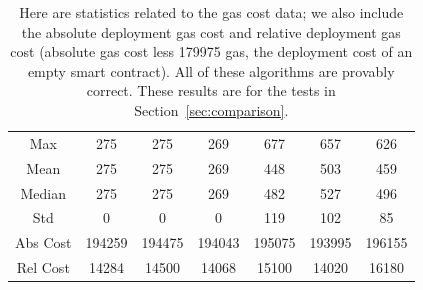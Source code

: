 \begin{table}[p]
\centering
\begin{tabular}{|c|
    |S[table-format=6.0]|S[table-format=6.0]
    |S[table-format=6.0]|S[table-format=6.0]
    |S[table-format=6.0]|S[table-format=6.0]|}
\hline
    &  \UnrolledOne{} &  \UnrolledTwo{} &
     \UnrolledThree{} &
    \WhileOne{} & \WhileTwo{} & \WhileThree{} \\
\hline
Max      &     275 &     275 &     269 &                          677 &                          657 &                          626 \\
Mean     &     275 &     275 &     269 &                          448 &                          503 &                          459 \\
Median   &     275 &     275 &     269 &                          482 &                          527 &                          496 \\
Std      &       0 &       0 &       0 &                          119 &                          102 &                           85 \\
\hline
Abs Cost &  194259 &  194475 &  194043 &  195075 &  193995 &  196155 \\
Rel Cost &   14284 &   14500 &   14068 &   15100 &   14020 &   16180 \\
\hline
\end{tabular}
\caption[Gas Costs Statistics 2]{Here are statistics
    related to the gas cost data;
    we also include the absolute deployment gas cost and
    relative deployment gas cost
    (absolute gas cost less \num{179975} gas,
    the deployment cost of an empty smart contract).
    All of these algorithms are provably correct.
    These results are for the tests in Section~\ref{sec:comparison}.
    }
\label{table:gas_costs_2}
\end{table}
